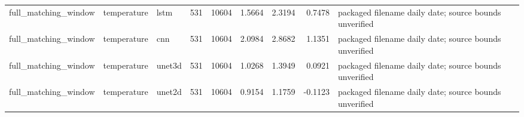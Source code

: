 \begin{tabular}{lllrrrrrl}
full_matching_window & temperature & lstm & 531 & 10604 & 1.5664 & 2.3194 & 0.7478 & packaged filename daily date; source bounds unverified \\
full_matching_window & temperature & cnn & 531 & 10604 & 2.0984 & 2.8682 & 1.1351 & packaged filename daily date; source bounds unverified \\
full_matching_window & temperature & unet3d & 531 & 10604 & 1.0268 & 1.3949 & 0.0921 & packaged filename daily date; source bounds unverified \\
full_matching_window & temperature & unet2d & 531 & 10604 & 0.9154 & 1.1759 & -0.1123 & packaged filename daily date; source bounds unverified \\
\bottomrule
\end{tabular}
